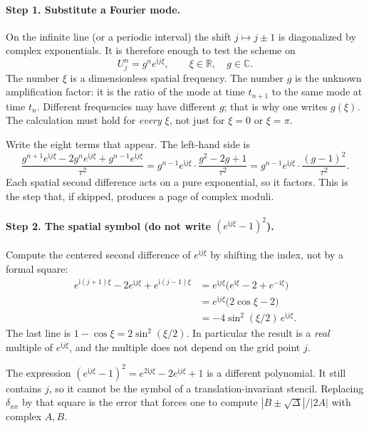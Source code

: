 \paragraph{Step 1. Substitute a Fourier mode.}

On the infinite line (or a periodic interval) the shift \(j\mapsto j\pm 1\) is diagonalized by complex exponentials. It is therefore enough to test the scheme on
\[
U_j^n
=
g^n e^{\mathrm i j\xi},
\qquad
\xi\in\mathbb R,\quad g\in\mathbb C.
\]
The number \(\xi\) is a dimensionless spatial frequency. The number \(g\) is the unknown amplification factor: it is the ratio of the mode at time \(t_{n+1}\) to the same mode at time \(t_n\). Different frequencies may have different \(g\); that is why one writes \(g(\xi)\). The calculation must hold for \emph{every} \(\xi\), not just for \(\xi=0\) or \(\xi=\pi\).

Write the eight terms that appear. The left-hand side is
\[
\frac{g^{n+1}e^{\mathrm i j\xi}-2g^n e^{\mathrm i j\xi}+g^{n-1}e^{\mathrm i j\xi}}{\tau^2}
=
g^{n-1}e^{\mathrm i j\xi}\cdot\frac{g^2-2g+1}{\tau^2}
=
g^{n-1}e^{\mathrm i j\xi}\cdot\frac{(g-1)^2}{\tau^2}.
\]
Each spatial second difference acts on a pure exponential, so it factors. This is the step that, if skipped, produces a page of complex moduli.

\paragraph{Step 2. The spatial symbol (do not write \((e^{\mathrm i j\xi}-1)^2\)).}

Compute the centered second difference of \(e^{\mathrm i j\xi}\) by shifting the index, not by a formal square:
\begin{align*}
e^{\mathrm i(j+1)\xi}-2e^{\mathrm i j\xi}+e^{\mathrm i(j-1)\xi}
&=
e^{\mathrm i j\xi}\bigl(e^{\mathrm i\xi}-2+e^{-\mathrm i\xi}\bigr)
\\
&=
e^{\mathrm i j\xi}\bigl(2\cos\xi-2\bigr)
\\
&=
-4\sin^2(\xi/2)\,e^{\mathrm i j\xi}.
\end{align*}
The last line is \(1-\cos\xi=2\sin^2(\xi/2)\). In particular the result is a \emph{real} multiple of \(e^{\mathrm i j\xi}\), and the multiple does not depend on the grid point \(j\).

The expression \((e^{\mathrm i j\xi}-1)^2=e^{2\mathrm i j\xi}-2e^{\mathrm i j\xi}+1\) is a different polynomial. It still contains \(j\), so it cannot be the symbol of a translation-invariant stencil. Replacing \(\delta_{xx}\) by that square is the error that forces one to compute \(|B\pm\sqrt{\Delta}|/|2A|\) with complex \(A,B\).

